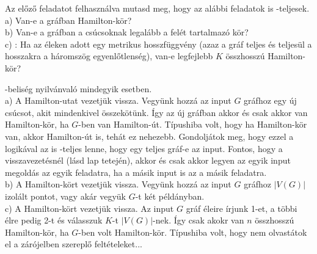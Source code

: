 \begin{Exercise}[counter={sorszam}, difficulty=0]
	Az el\H oz\H o feladatot felhaszn\'alva mutasd meg, hogy az al\'abbi feladatok is \NP-teljesek.\\
	a) Van-e a gr\'afban Hamilton-k\"or?\\
	b) Van-e a gr\'afban a cs\'ucsoknak legal\'abb a fel\'et tartalmaz\'o k\"or?\\
	c) : Ha az \'eleken adott egy metrikus hosszf\"uggv\'eny (azaz a gr\'af teljes \'es teljes\"ul a hosszakra a h\'aromsz\"og egyenl\H otlens\'eg), van-e legfejlebb $K$ \"osszhossz\'u Hamilton-k\"or?
\end{Exercise}	
\begin{Answer}
	\NP-belis\'eg nyilv\'anval\'o mindegyik esetben.\\
	a) A Hamilton-utat vezetj\"uk vissza. Vegy\"unk hozz\'a az input $G$ gr\'afhoz egy \'uj cs\'ucsot, akit mindenkivel \"osszek\"ot\"unk. \'Igy az \'uj gr\'afban akkor \'es csak akkor van Hamilton-k\"or, ha $G$-ben van Hamilton-\'ut.
	T\'ipushiba volt, hogy ha Hamilton-k\"or van, akkor Hamilton-\'ut is, teh\'at ez nehezebb. Gondolj\'atok meg, hogy ezzel a logik\'aval az is \NP-teljes lenne, hogy egy teljes gr\'af-e az input. Fontos, hogy a visszavezet\'esn\'el (l\'asd lap tetej\'en), akkor \'es csak akkor legyen az egyik input megold\'as az egyik feladatra, ha a m\'asik input is az a m\'asik feladatra.\\
	b) A Hamilton-k\"ort vezetj\"uk vissza. Vegy\"unk hozz\'a az input $G$ gr\'afhoz $|V(G)|$ izol\'alt pontot, vagy ak\'ar vegy\"uk $G$-t k\'et p\'eld\'anyban.\\
	c) A Hamilton-k\"ort vezetj\"uk vissza. Az input $G$ gr\'af \'eleire \'irjunk 1-et, a t\"obbi \'elre pedig 2-t \'es v\'alasszuk $K$-t $|V(G)|$-nek. \'Igy csak akokr van $n$ \"osszhossz\'u Hamilton-k\"or, ha $G$-ben volt Hamilton-k\"or. T\'ipushiba volt, hogy nem olvast\'atok el a z\'ar\'ojelben szerepl\H o felt\'eteleket...
\end{Answer}

